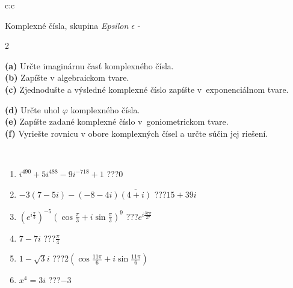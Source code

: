 \documentclass[10pt]{report}
\begin{document}
\begin{tabular}{c:c}
\begin{minipage}[c][104.5mm][t]{0.5\linewidth}
\begin{center}
\vspace{7mm}
{\huge Komplexné čísla, skupina \textit{Epsilon $\epsilon$} -}\\[5mm]
\begin{minipage}{0.95\linewidth}
\begin{center}
{\small \begin{multicols}{2} \raggedright
\textbf{(a)} Určte imaginárnu časť komplexného čísla. \\[1mm]
\textbf{(b)} Zapíšte v algebraickom tvare. \\[1mm]
\textbf{(c)} Zjednodušte a výsledné komplexné číslo zapíšte v~exponenciálnom tvare. \par \columnbreak
\textbf{(d)} Určte uhol \(\varphi\) komplexného čísla. \\[1mm]
\textbf{(e)} Zapíšte zadané komplexné číslo v~goniometrickom tvare. \\[1mm]
\textbf{(f)} Vyriešte rovnicu v obore komplexných čísel a určte súčin jej riešení.
\end{multicols}
}
\end{center}
\end{minipage}
\\[4mm]
\begin{minipage}{0.79\linewidth}
\begin{center}
\begin{varwidth}{\linewidth}
\begin{enumerate}
\large
\item $i^{490}+5i^{488}-9i^{-718}+1$\quad \dotfill\; ???\;\dotfill \quad $0$
\item $-3(7-5i)-(-8-4i)\overline{(4+i)}$\quad \dotfill\; ???\;\dotfill \quad $15+39i$
\item $\left(e^{i\frac{\pi}{3}}\right)^{-5}\left(\cos{\frac{\pi}{3}}+i\sin{\frac{\pi}{3}}\right)^{9}$\quad \dotfill\; ???\;\dotfill \quad $e^{i\frac{37\pi}{27}}$
\item $7-7i$\quad \dotfill\; ???\;\dotfill \quad $\frac{\pi}{4}$
\item $1-\sqrt{3}i$\quad \dotfill\; ???\;\dotfill \quad $2\left(\cos{\frac{11\pi}{6}}+i\sin{\frac{11\pi}{6}}\right)$
\item $x^4=3i$\quad \dotfill\; ???\;\dotfill \quad $-3$
\end{enumerate}
\end{varwidth}

\end{center}
\end{minipage}
\end{center}
\end{minipage}
\end{tabular}
\end{document}
